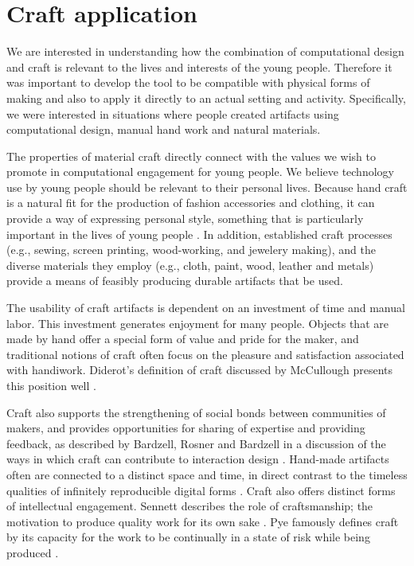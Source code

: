 \documentclass{sigchi}
\begin{document}
\section{Craft application}
We are interested in understanding how the combination of computational design and craft is relevant to the lives and interests of the young people. Therefore it was important to develop the tool to be compatible with physical forms of making and also to apply it directly to an actual setting and activity. Specifically, we were interested in situations where people created artifacts using computational design, manual hand work and natural materials.

The properties of material craft directly connect with the values we wish to promote in computational engagement for young people. We believe technology use by young people should be relevant to their personal lives. Because hand craft is a natural fit for the production of fashion accessories and clothing, it can provide a way of expressing personal style, something that is particularly important in the lives of young people \cite{lilypad}. In addition, established craft processes (e.g., sewing, screen printing, wood-working, and jewelery making), and the diverse materials they employ (e.g., cloth, paint, wood, leather and metals) provide a means of feasibly producing durable artifacts that be used. 

The usability of craft artifacts is dependent on an investment of time and manual labor. This investment generates enjoyment for many people. Objects that are made by hand offer a special form of value and pride for the maker, and traditional notions of craft often focus on the pleasure and satisfaction associated with handiwork. Diderot's definition of craft discussed by McCullough presents this position well \cite{abstracting_craft}. 

Craft also supports the strengthening of social bonds between communities of makers, and provides opportunities for sharing of expertise and providing feedback, as described by Bardzell, Rosner and Bardzell in a discussion of the ways in which craft can contribute to interaction design \cite{bardzell}. Hand-made artifacts often are connected to a distinct space and time, in direct contrast to the timeless qualities of infinitely reproducible digital forms \cite{zoran}. Craft also offers distinct forms of intellectual engagement. Sennett describes the role of craftsmanship; the motivation to produce quality work for its own sake \cite{the_craftsman}. Pye famously defines craft by its capacity for the work to be continually in a state of risk while being produced 
\cite{pye}. 
\end{document}

